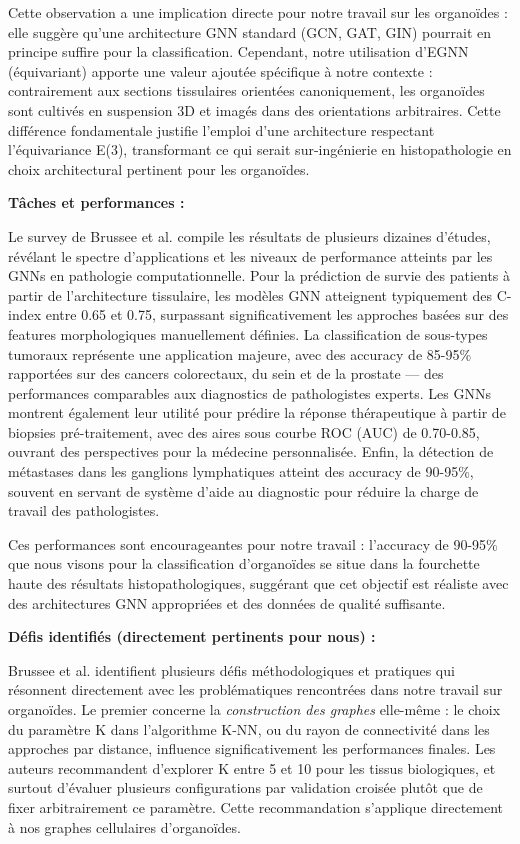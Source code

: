 Cette observation a une implication directe pour notre travail sur les organoïdes : elle suggère qu'une architecture GNN standard (GCN, GAT, GIN) pourrait en principe suffire pour la classification. Cependant, notre utilisation d'EGNN (équivariant) apporte une valeur ajoutée spécifique à notre contexte : contrairement aux sections tissulaires orientées canoniquement, les organoïdes sont cultivés en suspension 3D et imagés dans des orientations arbitraires. Cette différence fondamentale justifie l'emploi d'une architecture respectant l'équivariance E(3), transformant ce qui serait sur-ingénierie en histopathologie en choix architectural pertinent pour les organoïdes.

\textbf{Tâches et performances :}

Le survey de Brussee et al. compile les résultats de plusieurs dizaines d'études, révélant le spectre d'applications et les niveaux de performance atteints par les GNNs en pathologie computationnelle. Pour la prédiction de survie des patients à partir de l'architecture tissulaire, les modèles GNN atteignent typiquement des C-index entre 0.65 et 0.75, surpassant significativement les approches basées sur des features morphologiques manuellement définies. La classification de sous-types tumoraux représente une application majeure, avec des accuracy de 85-95\% rapportées sur des cancers colorectaux, du sein et de la prostate — des performances comparables aux diagnostics de pathologistes experts. Les GNNs montrent également leur utilité pour prédire la réponse thérapeutique à partir de biopsies pré-traitement, avec des aires sous courbe ROC (AUC) de 0.70-0.85, ouvrant des perspectives pour la médecine personnalisée. Enfin, la détection de métastases dans les ganglions lymphatiques atteint des accuracy de 90-95\%, souvent en servant de système d'aide au diagnostic pour réduire la charge de travail des pathologistes.

Ces performances sont encourageantes pour notre travail : l'accuracy de 90-95\% que nous visons pour la classification d'organoïdes se situe dans la fourchette haute des résultats histopathologiques, suggérant que cet objectif est réaliste avec des architectures GNN appropriées et des données de qualité suffisante.

\textbf{Défis identifiés (directement pertinents pour nous) :}

Brussee et al. identifient plusieurs défis méthodologiques et pratiques qui résonnent directement avec les problématiques rencontrées dans notre travail sur organoïdes. Le premier concerne la \textit{construction des graphes} elle-même : le choix du paramètre K dans l'algorithme K-NN, ou du rayon de connectivité dans les approches par distance, influence significativement les performances finales. Les auteurs recommandent d'explorer K entre 5 et 10 pour les tissus biologiques, et surtout d'évaluer plusieurs configurations par validation croisée plutôt que de fixer arbitrairement ce paramètre. Cette recommandation s'applique directement à nos graphes cellulaires d'organoïdes.

